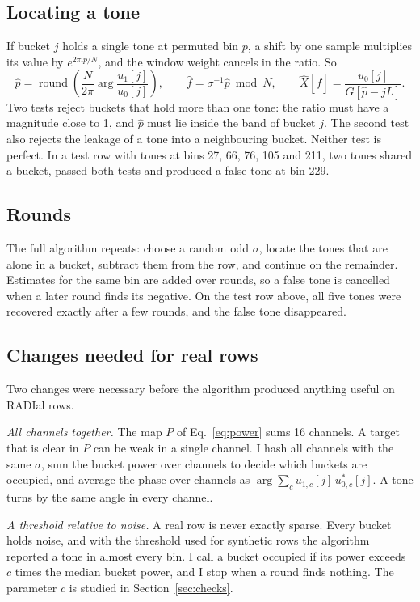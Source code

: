 \documentclass[10pt,a4paper]{article}
\begin{document}
\subsection{Locating a tone}
If bucket $j$ holds a single tone at permuted bin $p$, a shift by one sample multiplies its value by $e^{2\pi \mathrm{i} p / N}$, and the window weight cancels in the ratio. So
\begin{equation}
\hat{p} = \operatorname{round}\!\left( \frac{N}{2\pi} \arg \frac{u_1[j]}{u_0[j]} \right), \qquad \hat{f} = \sigma^{-1} \hat{p} \bmod N, \qquad \hat{X}[\hat{f}] = \frac{u_0[j]}{G[\hat{p} - jL]} .
\label{eq:locate}
\end{equation}
Two tests reject buckets that hold more than one tone: the ratio must have a magnitude close to 1, and $\hat{p}$ must lie inside the band of bucket $j$. The second test also rejects the leakage of a tone into a neighbouring bucket. Neither test is perfect. In a test row with tones at bins 27, 66, 76, 105 and 211, two tones shared a bucket, passed both tests and produced a false tone at bin 229.

\subsection{Rounds}
The full algorithm repeats: choose a random odd $\sigma$, locate the tones that are alone in a bucket, subtract them from the row, and continue on the remainder. Estimates for the same bin are added over rounds, so a false tone is cancelled when a later round finds its negative. On the test row above, all five tones were recovered exactly after a few rounds, and the false tone disappeared.

\subsection{Changes needed for real rows}
Two changes were necessary before the algorithm produced anything useful on RADIal rows.

\emph{All channels together.} The map $P$ of Eq.~\eqref{eq:power} sums 16 channels. A target that is clear in $P$ can be weak in a single channel. I hash all channels with the same $\sigma$, sum the bucket power over channels to decide which buckets are occupied, and average the phase over channels as $\arg \sum_c u_{1,c}[j]\, u_{0,c}^*[j]$. A tone turns by the same angle in every channel.

\emph{A threshold relative to noise.} A real row is never exactly sparse. Every bucket holds noise, and with the threshold used for synthetic rows the algorithm reported a tone in almost every bin. I call a bucket occupied if its power exceeds $c$ times the median bucket power, and I stop when a round finds nothing. The parameter $c$ is studied in Section~\ref{sec:checks}.
\end{document}
